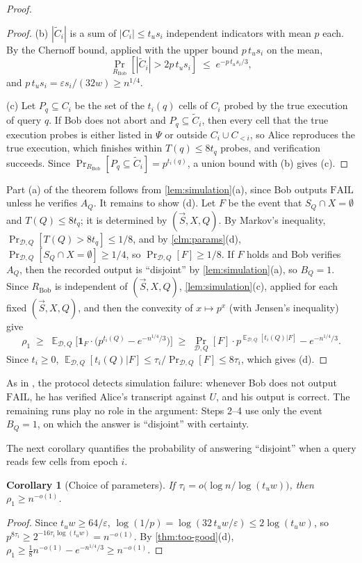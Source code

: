 \documentclass[11pt]{article}
\theoremstyle{plain}
\newtheorem{corollary}[theorem]{Corollary}
\theoremstyle{definition}
\theoremstyle{remark}
\newcommand{\eps}{\varepsilon}
\newcommand{\E}{\mathop{\mathbb{E}}}
\newcommand{\abs}[1]{\left|#1\right|}
\newcommand{\cD}{\mathcal{D}}
\newcommand{\vS}{\vec{S}}
\newcommand{\Csam}{\widetilde{C}_i}
\begin{document}
\begin{proof}
\begin{proof}
(b) $\abs{\Csam}$ is a sum of $\abs{C_i} \le t_u s_i$ independent indicators with mean $p$ each. By the Chernoff bound, applied with the upper bound $p\, t_u s_i$ on the mean,
\[ \Pr_{R_{\mathrm{Bob}}}\left[\abs{\Csam} > 2p\, t_u s_i\right] \;\le\; e^{-p\, t_u s_i/3}, \]
and $p\, t_u s_i = \eps s_i/(32 w) \ge n^{1/4}$.

(c) Let $P_q \subseteq C_i$ be the set of the $t_i(q)$ cells of $C_i$ probed by the true execution of query $q$. If Bob does not abort and $P_q \subseteq \Csam$, then every cell that the true execution probes is either listed in $\Psi$ or outside $C_i \cup C_{<i}$, so Alice reproduces the true execution, which finishes within $T(q) \le 8 t_q$ probes, and verification succeeds. Since $\Pr_{R_{\mathrm{Bob}}}[P_q \subseteq \Csam] = p^{t_i(q)}$, a union bound with (b) gives (c).
\end{proof}

Part (a) of the theorem follows from \cref{lem:simulation}(a), since Bob outputs $\mathrm{FAIL}$ unless he verifies $A_Q$. It remains to show (d). Let $F$ be the event that $S_Q \cap X = \emptyset$ and $T(Q) \le 8 t_q$; it is determined by $(\vS, X, Q)$. By Markov's inequality, $\Pr_{\cD,Q}[T(Q) > 8 t_q] \le 1/8$, and by \cref{clm:params}(d), $\Pr_{\cD,Q}[S_Q \cap X = \emptyset] \ge 1/4$, so $\Pr_{\cD,Q}[F] \ge 1/8$. If $F$ holds and Bob verifies $A_Q$, then the recorded output is ``disjoint'' by \cref{lem:simulation}(a), so $B_Q = 1$. Since $R_{\mathrm{Bob}}$ is independent of $(\vS, X, Q)$, \cref{lem:simulation}(c), applied for each fixed $(\vS, X, Q)$, and then the convexity of $x \mapsto p^x$ (with Jensen's inequality) give
\[ \rho_1 \;\ge\; \E_{\cD,Q}\Big[\mathbf{1}_F \cdot \big(p^{t_i(Q)} - e^{-n^{1/4}/3}\big)\Big] \;\ge\; \Pr_{\cD,Q}[F] \cdot p^{\E_{\cD,Q}[t_i(Q) | F]} - e^{-n^{1/4}/3}. \]
Since $t_i \ge 0$, $\E_{\cD,Q}[t_i(Q) | F] \le \tau_i/\Pr_{\cD,Q}[F] \le 8\tau_i$, which gives (d).
\end{proof}

\noindent As in \cite[Remark~3.4]{ko_omega_2026}, the protocol detects simulation failure: whenever Bob does not output $\mathrm{FAIL}$, he has verified Alice's transcript against $U$, and his output is correct. The remaining runs play no role in the argument: Steps 2--4 use only the event $B_Q = 1$, on which the answer is ``disjoint'' with certainty.

The next corollary quantifies the probability of answering ``disjoint'' when a query reads few cells from epoch $i$.

\begin{corollary}[Choice of parameters]\label{cor:too-good}
If $\tau_i = o\big(\log n/\log(t_u w)\big)$, then $\rho_1 \ge n^{-o(1)}$.
\end{corollary}
\begin{proof}
Since $t_u w \ge 64/\eps$, $\log(1/p) = \log(32\, t_u w/\eps) \le 2\log(t_u w)$, so $p^{8\tau_i} \ge 2^{-16\tau_i\log(t_u w)} = n^{-o(1)}$. By \cref{thm:too-good}(d), $\rho_1 \ge \frac18 n^{-o(1)} - e^{-n^{1/4}/3} \ge n^{-o(1)}$.
\end{proof}
\end{document}
